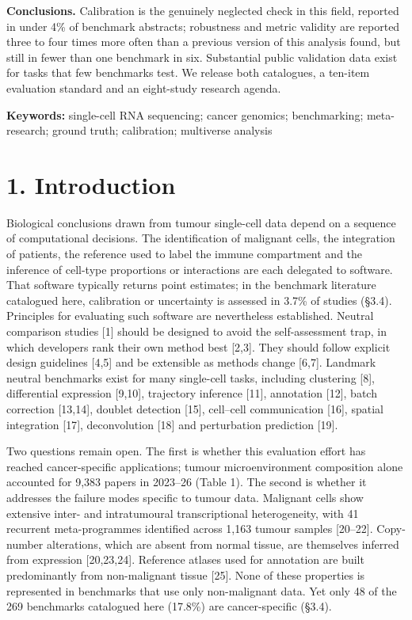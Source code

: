 \documentclass[11pt]{article}
\begin{document}
\textbf{Conclusions.} Calibration is the genuinely neglected check in
this field, reported in under 4\% of benchmark abstracts; robustness and
metric validity are reported three to four times more often than a
previous version of this analysis found, but still in fewer than one
benchmark in six. Substantial public validation data exist for tasks
that few benchmarks test. We release both catalogues, a ten-item
evaluation standard and an eight-study research agenda.

\textbf{Keywords:} single-cell RNA sequencing; cancer genomics;
benchmarking; meta-research; ground truth; calibration; multiverse
analysis

\endgroup
\clearpage
\section{1. Introduction}\label{introduction}

Biological conclusions drawn from tumour single-cell data depend on a
sequence of computational decisions. The identification of malignant
cells, the integration of patients, the reference used to label the
immune compartment and the inference of cell-type proportions or
interactions are each delegated to software. That software typically
returns point estimates; in the benchmark literature catalogued here,
calibration or uncertainty is assessed in 3.7\% of studies (§3.4).
Principles for evaluating such software are nevertheless established.
Neutral comparison studies {[}1{]} should be designed to avoid the
self-assessment trap, in which developers rank their own method best
{[}2,3{]}. They should follow explicit design guidelines {[}4,5{]} and
be extensible as methods change {[}6,7{]}. Landmark neutral benchmarks
exist for many single-cell tasks, including clustering {[}8{]},
differential expression {[}9,10{]}, trajectory inference {[}11{]},
annotation {[}12{]}, batch correction {[}13,14{]}, doublet detection
{[}15{]}, cell--cell communication {[}16{]}, spatial integration
{[}17{]}, deconvolution {[}18{]} and perturbation prediction {[}19{]}.

Two questions remain open. The first is whether this evaluation effort
has reached cancer-specific applications; tumour microenvironment
composition alone accounted for 9,383 papers in 2023--26 (Table 1). The
second is whether it addresses the failure modes specific to tumour
data. Malignant cells show extensive inter- and intratumoural
transcriptional heterogeneity, with 41 recurrent meta-programmes
identified across 1,163 tumour samples {[}20--22{]}. Copy-number
alterations, which are absent from normal tissue, are themselves
inferred from expression {[}20,23,24{]}. Reference atlases used for
annotation are built predominantly from non-malignant tissue {[}25{]}.
None of these properties is represented in benchmarks that use only
non-malignant data. Yet only 48 of the 269 benchmarks catalogued here
(17.8\%) are cancer-specific (§3.4).
\end{document}
